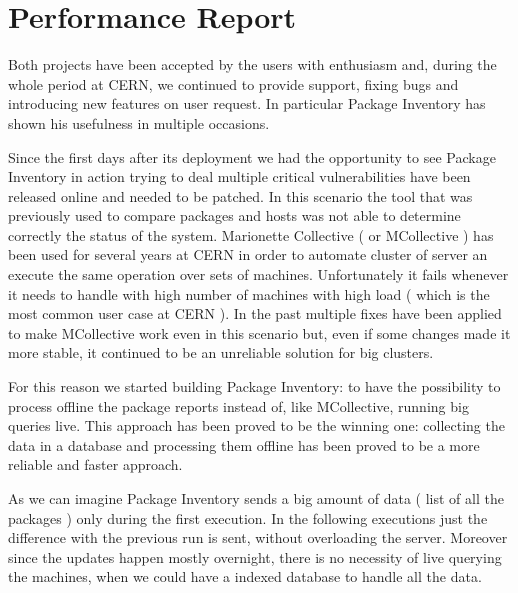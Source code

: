 \section{Performance Report}

Both projects have been accepted by the users with enthusiasm and, during
the whole period at CERN, we continued to provide support, fixing bugs and
introducing new features on user request. In particular Package Inventory
has shown his usefulness in multiple occasions.

Since the first days after its deployment we had the opportunity to see
Package Inventory in action trying to deal multiple critical
vulnerabilities have been released online and needed to be patched. In
this scenario the tool that was previously used to compare packages and
hosts was not able to determine correctly the status of the system.
Marionette Collective ( or MCollective ) has been used for several years
at CERN in order to automate cluster of server an execute the same
operation over sets of machines. Unfortunately it fails whenever it needs
to handle with high number of machines with high load ( which is the most
common user case at CERN ). In the past multiple fixes have been applied
to make MCollective work even in this scenario but, even if some changes
made it more stable, it continued to be an unreliable solution for big
clusters.

For this reason we started building Package Inventory: to have the
possibility to process offline the package reports instead of, like
MCollective, running big queries live. This approach has been proved to be
the winning one: collecting the data in a database and processing them
offline has been proved to be a more reliable and faster approach.

As we can imagine Package Inventory sends a big amount of data ( list of
all the packages ) only during the first execution. In the following
executions just the difference with the previous run is sent, without
overloading the server. Moreover since the updates happen mostly
overnight, there is no necessity of live querying the machines, when we
could have a indexed database to handle all the data.

